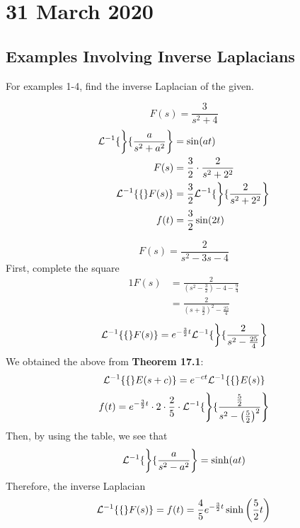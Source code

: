 \documentclass[diffeq.tex]{subfiles}
\begin{document}
\chapter{31 March 2020}
    \section{Examples Involving Inverse Laplacians}
    For examples 1-4, find the inverse Laplacian of the given.
    \begin{example}
        \begin{equation}
            F(s) = \frac{3}{s^{2} + 4}
        \end{equation}
        \begin{alignat}{1}
            \mathcal{L}^{-1}\{\left\}\{\frac{a}{s^{2} + a^{2}}\right\} &= \sin(at)\\
            F(s) &= \frac{3}{2} \cdot \frac{2}{s^{2} + 2^{2}}\\
            \mathcal{L}^{-1}\{\{\}F(s)\} &= \frac{3}{2}\mathcal{L}^{-1}\{\left\}\{\frac{2}{s^{2} + 2^{2}}\right\}\\
            f(t) &= \frac{3}{2}\sin(2t)
        \end{alignat}
    \end{example}
    \begin{example}
        \begin{equation}
            F(s) = \frac{2}{s^{2} - 3s - 4}
        \end{equation}
        First, complete the square
        \begin{alignat}{1}
            F(s) &= \frac{2}{\left(s^{2} - \frac{3}{2}\right) - 4 - \frac{9}{4}}\\
            &= \frac{2}{\left(s + \frac{3}{2}\right)^{2} - \frac{25}{4}}
        \end{alignat}
        \begin{equation}
            \mathcal{L}^{-1}\{\{\}F(s)\} = e^{-\frac{3}{2}t}\mathcal{L}^{-1}\{\left\}\{\frac{2}{s^{2} - \frac{25}{4}}\right\}
        \end{equation}
        We obtained the above from \textbf{Theorem 17.1}:
        \begin{equation}
            \mathcal{L}^{-1}\{\{\}E(s + c)\} = e^{-ct}\mathcal{L}^{-1}\{\{\}E(s)\}
        \end{equation}
        \begin{alignat}{1}
            f(t) = e^{-\frac{3}{2}t}\cdot 2\cdot \frac{2}{5}\cdot \mathcal{L}^{-1}\{\left\}\{\frac{\frac{5}{2}}{s^{2} - \left(\frac{5}{2}\right)^{2}}\right\}
        \end{alignat}
        Then, by using the table, we see that
        \begin{equation}
            \mathcal{L}^{-1}\{\left\}\{\frac{a}{s^{2} - a^{2}}\right\} = \sinh(at)
        \end{equation}
        Therefore, the inverse Laplacian
        \begin{equation}
            \mathcal{L}^{-1}\{\{\}F(s)\} = f(t) = \frac{4}{5}e^{-\frac{3}{2}t}\sinh\left(\frac{5}{2}t\right)
        \end{equation}
    \end{example}
\end{document}
